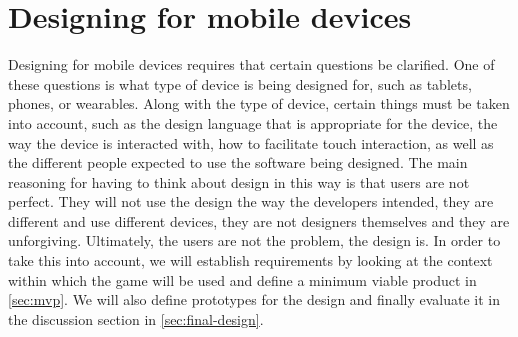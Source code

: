 \section{Designing for mobile devices}\label{sec:design-intro}
Designing for mobile devices requires that certain questions be clarified.
One of these questions is what type of device is being designed for, such as tablets, phones, or wearables.
Along with the type of device, certain things must be taken into account, such as the design language that is appropriate for the device, the way the device is interacted with,  how to facilitate touch interaction, as well as the different people expected to use the software being designed.
The main reasoning for having to think about design in this way is that users are not perfect.
They will not use the design the way the developers intended, they are different and use different devices, they are not designers themselves and they are unforgiving.
Ultimately, the users are not the problem, the design is.
In order to take this into account, we will establish requirements by looking at the context within which the game will be used and define a minimum viable product in \autoref{sec:mvp}.
We will also define prototypes for the design and finally evaluate it in the discussion section in \autoref{sec:final-design}.
